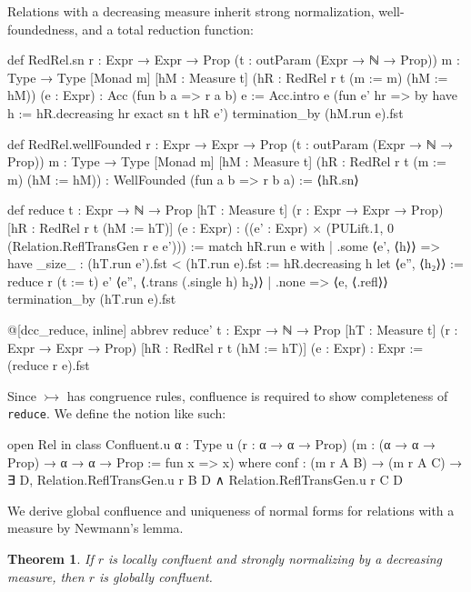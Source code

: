 \documentclass{article}
\newtheorem{theorem}{Theorem}
\newcommand{\affarr}{\rightarrowtail}
\begin{document}
Relations with a decreasing measure inherit strong normalization, well-foundedness, and a total reduction function:

\begin{leancode}
def RedRel.sn {r : Expr → Expr → Prop} (t : outParam (Expr → ℕ → Prop))
  {m : Type → Type} [Monad m] [hM : Measure t]
  (hR : RedRel r t (m := m) (hM := hM)) (e : Expr) : Acc (fun b a => r a b) e :=
    Acc.intro e (fun e' hr => by
    have h := hR.decreasing hr
    exact sn t hR e')
termination_by (hM.run e).fst

def RedRel.wellFounded {r : Expr → Expr → Prop} (t : outParam (Expr → ℕ → Prop))
  {m : Type → Type} [Monad m] [hM : Measure t]
  (hR : RedRel r t (m := m) (hM := hM)) : WellFounded (fun a b => r b a) := ⟨hR.sn⟩

def reduce {t : Expr → ℕ → Prop} [hT : Measure t] (r : Expr → Expr → Prop)
  [hR : RedRel r t (hM := hT)] (e : Expr) :
  ((e' : Expr) × (PULift.{1, 0} (Relation.ReflTransGen r e e'))) :=
  match hR.run e with
  | .some ⟨e', ⟨h⟩⟩ =>
    have _size_ : (hT.run e').fst < (hT.run e).fst := hR.decreasing h
    let ⟨e'', ⟨h₂⟩⟩ := reduce r (t := t) e'
    ⟨e'', ⟨.trans (.single h) h₂⟩⟩
  | .none => ⟨e, ⟨.refl⟩⟩
termination_by (hT.run e).fst

@[dcc_reduce, inline] abbrev reduce' {t : Expr → ℕ → Prop} [hT : Measure t]
  (r : Expr → Expr → Prop) [hR : RedRel r t (hM := hT)]
  (e : Expr) : Expr := (reduce r e).fst
\end{leancode}

Since \(\affarr\) has congruence rules, confluence is required to show completeness of \texttt{reduce}. We define the notion like such:

\begin{leancode}
open Rel in class Confluent.{u} {α : Type u} (r : α → α → Prop)
  (m : (α → α → Prop) → α → α → Prop := fun x => x) where
  conf : (m r A B) → (m r A C) → ∃ D, Relation.ReflTransGen.{u} r B D
  ∧ Relation.ReflTransGen.{u} r C D
\end{leancode}

We derive global confluence and uniqueness of normal forms for relations with a measure by Newmann's lemma.

\begin{theorem}
  If \(r\) is locally confluent and strongly normalizing by a decreasing measure, then \(r\) is globally confluent.
\end{theorem}
\end{document}
